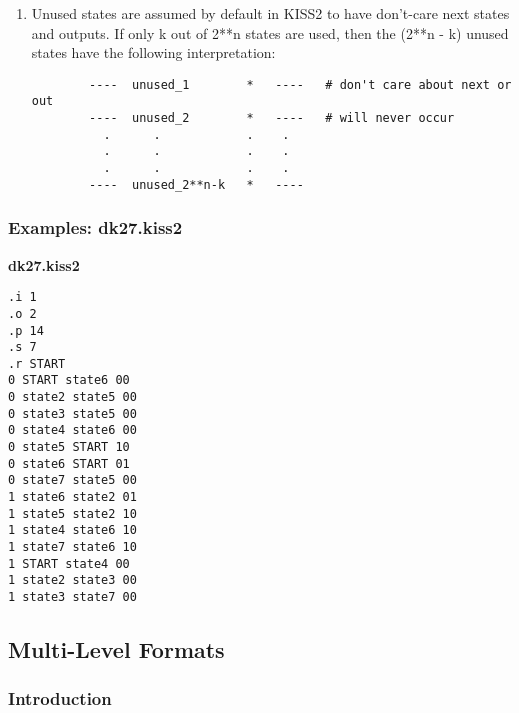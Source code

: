 {\begin{pespace}
\begin{enumerate}
\begin{verbatim}
        .     .    .      .
        .     .    .      .
       1---   *  RESET  0000 # go to state RESET if bit 0 is true,
                             # regardless of the current state
\end{verbatim}


   Don't-care next states are usually indicated if an input and
   current-state condition can not occur.  In this case, outputs
   would also be don't care (indicated by - for each output).

\item    Unused states are assumed by default in KISS2 to have don't-care 
   next states and outputs.  If only k out of 2**n states are used, 
   then the (2**n - k) unused states have the following interpretation:

\begin{verbatim}
        ----  unused_1        *   ----   # don't care about next or out
        ----  unused_2        *   ----   # will never occur
          .      .            .    .
          .      .            .    .
          .      .            .    .
        ----  unused_2**n-k   *   ----   
\end{verbatim}

\end{enumerate}




\newpage
\subsubsection{   Examples: dk27.kiss2}


{\large \bf dk27.kiss2}

\begin{verbatim}
.i 1 
.o 2 
.p 14 
.s 7
.r START
0 START state6 00
0 state2 state5 00
0 state3 state5 00
0 state4 state6 00
0 state5 START 10
0 state6 START 01
0 state7 state5 00
1 state6 state2 01
1 state5 state2 10
1 state4 state6 10
1 state7 state6 10
1 START state4 00
1 state2 state3 00
1 state3 state7 00
\end{verbatim}

\vspace*{0.5cm}


\newpage
\subsection{ Multi-Level Formats }

\subsubsection{ Introduction }


\end{pespace}}
